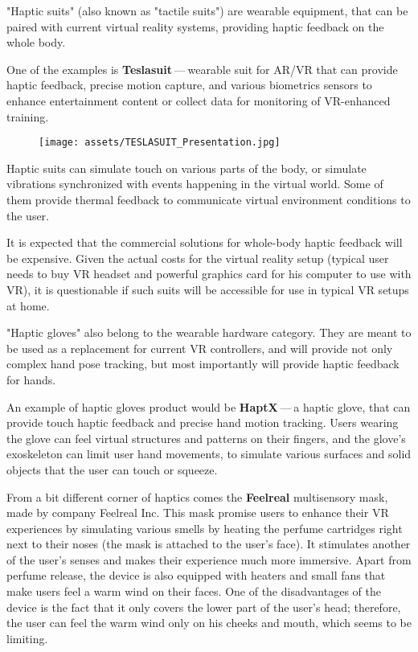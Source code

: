 "Haptic suits" (also known as "tactile suits") are wearable
equipment, that can be paired with current virtual reality systems, providing
haptic feedback on the whole body.


One of the examples is \textbf{Teslasuit} — wearable suit for AR/VR that can provide
haptic feedback, precise motion capture, and various biometrics sensors to
enhance entertainment content or collect data for monitoring of
VR-enhanced training. \cite{teslasuitab}


\begin{figure}[h]{}
\centering\texttt{[image: assets/TESLASUIT\_Presentation.jpg]}
\caption{}

\end{figure}

Haptic suits can simulate touch on various parts of the body, or simulate
vibrations synchronized with events happening in the virtual world. Some
of them provide thermal feedback to communicate virtual environment
conditions to the user.


It is expected that the commercial solutions for whole-body haptic feedback
will be expensive. Given the actual costs for the virtual reality setup
(typical user needs to buy VR headset and powerful graphics card for his computer
to use with VR), it is questionable if such suits will be
accessible for use in typical VR setups at home.



"Haptic gloves" also belong to the wearable hardware category. They are meant to be
used as a replacement for current VR controllers, and will provide not only
complex hand pose tracking, but most importantly will provide
haptic feedback for hands.


An example of haptic gloves product would be \textbf{HaptX} — a haptic
glove, that can provide touch haptic feedback and precise
hand motion tracking. Users wearing the glove can feel virtual structures
and patterns on their fingers, and the glove’s exoskeleton can limit user
hand movements, to simulate various surfaces and solid objects that the user can
touch or squeeze. \cite{haptxtech}

From a bit different corner of haptics comes the \textbf{Feelreal} multisensory
mask, made by company Feelreal Inc. This mask promise users to enhance
their VR experiences by simulating various smells by heating the perfume
cartridges right next to their noses (the mask is attached to the user’s face).
It stimulates another of the user’s senses and makes their
experience much more immersive. Apart from perfume release, the device is
also equipped with heaters and small fans that make users feel a warm
wind on their faces. One of the disadvantages of the device is the fact that
it only covers the lower part of the user’s head; therefore, the user can feel
the warm wind only on his cheeks and mouth, which seems to be limiting.
